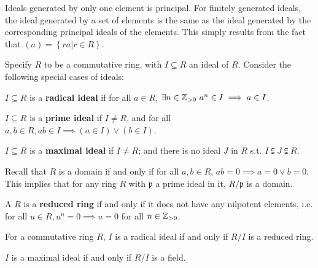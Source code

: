 \documentclass{article}
\begin{document}
\vspace{1em}
\begin{remark}
    Ideals generated by only one element is principal. For finitely generated ideals, the ideal generated by a set of elements is the same as the ideal generated by the corresponding principal ideals of the elements. This simply results from the fact that $(a) = \left\{ ra | r\in R \right\}$.
\end{remark}

Specify $R$ to be a commutative ring, with $I \subseteq R$ an ideal of $R$. Consider the following special cases of ideals:

\begin{definition}
    $I \subseteq R$ is a \textbf{radical ideal} if for all $a\in R$, $\exists n\in \mathbb{Z}_{>0}\ a^n\in I \implies a\in I$.
\end{definition}

\begin{definition}
    $I \subseteq R$ is a \textbf{prime ideal} if $I \neq R$, and for all $a, b\in R, ab\in I \implies (a\in I) \vee (b\in I)$.
\end{definition}

\begin{definition}
    $I \subseteq R$ is a \textbf{maximal ideal} if $I \neq R$; and there is no ideal $J$ in $R$ s.t. $I \subsetneqq J \subsetneqq R$. 
\end{definition}

\begin{remark}
    Recall that $R$ is a domain if and only if for all $a, b\in R$, $ab = 0 \implies a = 0 \vee b = 0$. This implies that for any ring $R$ with $\mathfrak{p}$ a prime ideal in it, $R/\mathfrak{p}$ is a domain. 
\end{remark}

\begin{definition}
    A $R$ is a \textbf{reduced ring} if and only if it does not have any nilpotent elements, i.e. for all $u\in R, u^n = 0 \implies u = 0$ for all $n\in \mathbb{Z}_{>0}$.
\end{definition}

\begin{remark}
    For a commutative ring $R$, $I$ is a radical ideal if and only if $R/I$ is a reduced ring.
\end{remark}

\begin{proposition}
    $I$ is a maximal ideal if and only if $R/I$ is a field. 
\end{proposition}
\end{document}
